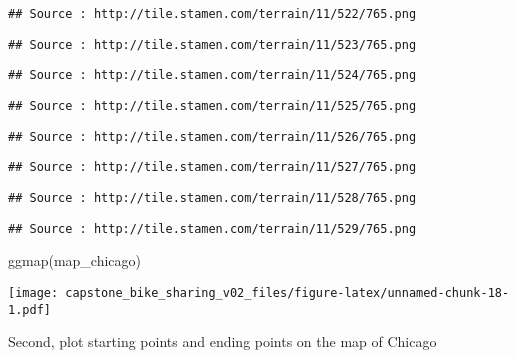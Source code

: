 \documentclass[
]{article}
\newenvironment{Shaded}{\begin{snugshade}}{\end{snugshade}}
\newcommand{\FunctionTok}[1]{\textcolor[rgb]{0.00,0.00,0.00}{#1}}
\newcommand{\NormalTok}[1]{#1}
\begin{document}
\begin{verbatim}
## Source : http://tile.stamen.com/terrain/11/522/765.png
\end{verbatim}

\begin{verbatim}
## Source : http://tile.stamen.com/terrain/11/523/765.png
\end{verbatim}

\begin{verbatim}
## Source : http://tile.stamen.com/terrain/11/524/765.png
\end{verbatim}

\begin{verbatim}
## Source : http://tile.stamen.com/terrain/11/525/765.png
\end{verbatim}

\begin{verbatim}
## Source : http://tile.stamen.com/terrain/11/526/765.png
\end{verbatim}

\begin{verbatim}
## Source : http://tile.stamen.com/terrain/11/527/765.png
\end{verbatim}

\begin{verbatim}
## Source : http://tile.stamen.com/terrain/11/528/765.png
\end{verbatim}

\begin{verbatim}
## Source : http://tile.stamen.com/terrain/11/529/765.png
\end{verbatim}

\begin{Shaded}
\begin{Highlighting}[]
\FunctionTok{ggmap}\NormalTok{(map\_chicago)}
\end{Highlighting}
\end{Shaded}

\texttt{[image: capstone\_bike\_sharing\_v02\_files/figure-latex/unnamed-chunk-18-1.pdf]}

Second, plot starting points and ending points on the map of Chicago
\end{document}
